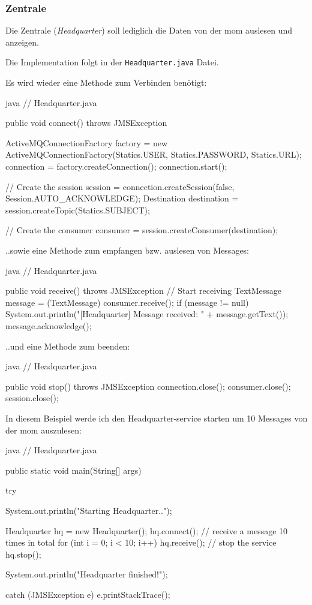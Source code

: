 \clearpage
\subsubsection{Zentrale}
\label{sec:headquarters}

Die Zentrale (\textit{Headquarter}) soll lediglich die Daten von der \gls{mom} auslesen und anzeigen.

Die Implementation folgt in der \texttt{Headquarter.java} Datei.

Es wird wieder eine Methode zum Verbinden benötigt:

\begin{code}{java}
// Headquarter.java

public void connect() throws JMSException {
    ActiveMQConnectionFactory factory = new ActiveMQConnectionFactory(Statics.USER, Statics.PASSWORD, Statics.URL);
    connection = factory.createConnection();
    connection.start();

    // Create the session
    session = connection.createSession(false, Session.AUTO_ACKNOWLEDGE);
    Destination destination = session.createTopic(Statics.SUBJECT);

    // Create the consumer
    consumer = session.createConsumer(destination);
}
\end{code}

..sowie eine Methode zum empfangen bzw. auslesen von Messages:

\begin{code}{java}
// Headquarter.java

public void receive() throws JMSException {
    // Start receiving
    TextMessage message = (TextMessage) consumer.receive();
    if (message != null) {
        System.out.println("[Headquarter] Message received: " + message.getText());
        message.acknowledge();
    }
}
\end{code}

..und eine Methode zum beenden:

\begin{code}{java}
// Headquarter.java

public void stop() throws JMSException {
    connection.close();
    consumer.close();
    session.close();
}
\end{code}

In diesem Beispiel werde ich den Headquarter-service starten um 10 Messages von der \gls{mom} auszulesen:

\begin{code}{java}
// Headquarter.java

public static void main(String[] args) {
    try {
        System.out.println("Starting Headquarter..");

        Headquarter hq = new Headquarter();
        hq.connect();
        // receive a message 10 times in total
        for (int i = 0; i < 10; i++) {
            hq.receive();
        }
        // stop the service
        hq.stop();

        System.out.println("Headquarter finished!");
    } catch (JMSException e) {
        e.printStackTrace();
    }
}
\end{code}
